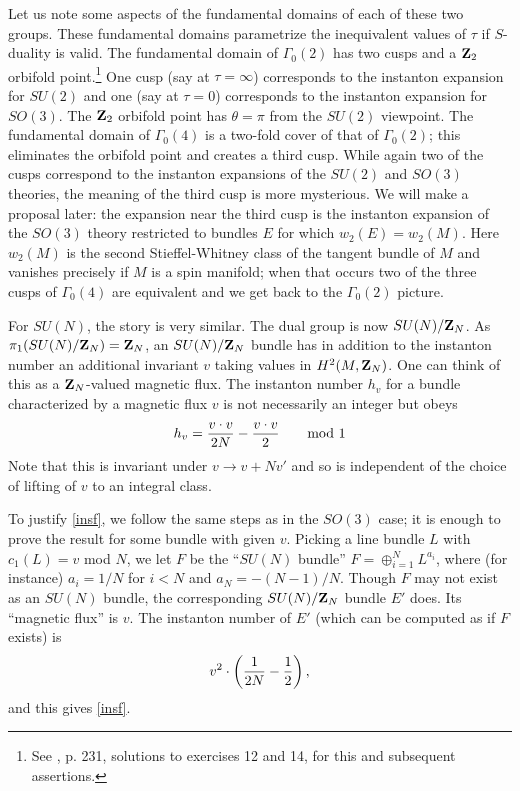 \documentclass[12pt]{article}
\numberwithin{equation}{section}
\begin{document}
Let us note some aspects of
the fundamental domains of each of these two groups.
These fundamental domains parametrize
the inequivalent values of
$\tau$
if $S$-duality is valid.
The fundamental domain of $\Gamma_0(2)$ has two cusps and a ${\bf Z}_2$
orbifold point.\footnote{See \cite{koblitz}, p. 231, solutions to
exercises 12 and 14, for this and subsequent assertions.}  One cusp
(say at $\tau=\infty$) corresponds
to the instanton expansion for $SU(2)$ and one (say at $\tau=0$)
corresponds to the instanton expansion for $SO(3)$.  The ${\bf Z}_2$
orbifold point has $\theta=\pi$ from the $SU(2)$ viewpoint.
The fundamental domain of $\Gamma_0(4)$
is a two-fold cover of that of $\Gamma_0(2)$; this eliminates
the orbifold point and creates a third cusp.
While again two of the cusps correspond to the instanton expansions
of the $SU(2)$ and $SO(3)$ theories, the meaning of the third cusp
is more mysterious.  We will make a proposal later: the expansion
near the third cusp is the instanton expansion of the $SO(3)$ theory
restricted to bundles $E$ for which $w_2(E)=w_2(M)$.  Here $w_2(M)$
is the second Stieffel-Whitney class of the tangent bundle of $M$
and vanishes precisely if $M$ is a spin manifold; when that occurs
two of the three cusps of $\Gamma_0(4)$ are equivalent and we get
back to the $\Gamma_0(2)$ picture.

\bigskip
{}

For $SU(N)$, the story is very similar.  The dual group is now
$SU(N)/{\bf Z}_{ N}$.  As $\pi_1(SU(N)/{\bf Z}_N) ={\bf Z}_N$,
an $SU(N)/{\bf Z}_N$ bundle has in addition to the instanton number
an additional invariant $v$ taking values in $H^2(M,{\bf Z}_N)$.
One can think of this as a ${\bf Z}_N$-valued magnetic flux.
The instanton number $h_v$
for a bundle characterized by a magnetic flux $v$ is not necessarily
an integer but obeys
%
\begin{equation}
  \label{insf}
  h_v={v\cdot v \over 2N}-{v\cdot v\over 2} \qquad {\rm mod }\ 1
\end{equation}
%
Note that this is invariant under $v\to v+Nv'$ and so is
independent of the choice of lifting
of $v$ to an integral class.

To justify \eqref{insf}, we follow the same steps as in the $SO(3)$ case;
it is enough to prove the result for some bundle with given $v$.
Picking a line bundle $L$ with $c_1(L)=v$ mod $N$, we let $F$
be the ``$SU(N)$ bundle'' $F=\oplus_{i=1}^NL^{a_i}$,
where (for instance) $a_i=1/N$ for $i<N$ and $a_N=-(N-1)/N$.
Though $F$ may not
exist as an $SU(N)$ bundle, the corresponding $SU(N)/{\bf Z}_N$ bundle
$E'$ does.  Its ``magnetic flux'' is $v$.
The instanton number of $E'$ (which can be computed
as if $F$ exists) is
\begin{equation}
  \label{nurgo}
  v^2\cdot\left({1\over 2N}-{1\over 2}\right),
\end{equation}
and this gives \eqref{insf}.
\end{document}
